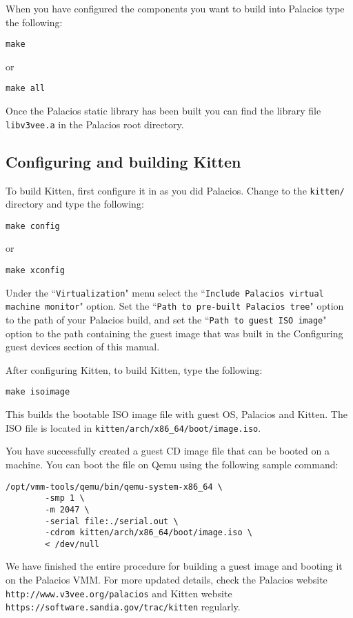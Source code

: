 \documentclass{article}[11pt]
\begin{document}
\vspace{10pt}
\noindent
When you have configured the components you want to build into Palacios type
the following:
\begin{verbatim}
make
\end{verbatim}
or
\begin{verbatim}
make all
\end{verbatim}

\vspace{10pt}
\noindent
Once the Palacios static library has been built you can find the library file
\verb+libv3vee.a+ in the Palacios root directory.

\subsection*{Configuring and building Kitten}

To build Kitten, first configure it in as you did Palacios. Change to the
\verb+kitten/+ directory and type the following:
\begin{verbatim}
make config
\end{verbatim}
or
\begin{verbatim}
make xconfig
\end{verbatim}

\vspace{10pt}
\noindent
Under the ``\verb|Virtualization|" menu select the
``\verb|Include Palacios virtual machine monitor|" option. Set the
``\verb|Path to pre-built Palacios tree|" option to the path of your Palacios
build, and set the ``\verb|Path to guest ISO image|" option to the path
containing the guest image that was built in the Configuring guest devices
section of this manual.

\vspace{10pt}
\noindent
After configuring Kitten, to build Kitten, type the following:
\begin{verbatim}
make isoimage
\end{verbatim}

\vspace{10pt}
\noindent
This builds the bootable ISO image file with guest OS, Palacios and Kitten.
The ISO file is located in \verb+kitten/arch/x86_64/boot/image.iso+.

\vspace{5pt}
\noindent
You have successfully created a guest CD image file that can be booted on a
machine. You can boot the file on Qemu using the following sample command:

\begin{verbatim}
/opt/vmm-tools/qemu/bin/qemu-system-x86_64 \
        -smp 1 \
        -m 2047 \
        -serial file:./serial.out \
        -cdrom kitten/arch/x86_64/boot/image.iso \
        < /dev/null
\end{verbatim}

\vspace{10pt}
\noindent
We have finished the entire procedure for building a guest image and booting it
on the Palacios VMM. For more updated details, check the Palacios website
\verb+http://www.v3vee.org/palacios+ and Kitten website
\verb+https://software.sandia.gov/trac/kitten+ regularly.
\end{document}
